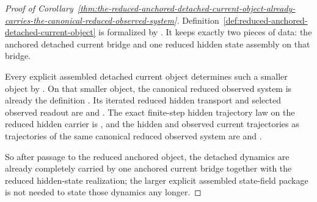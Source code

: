 \begin{proof}[Proof of Corollary~\ref{thm:the-reduced-anchored-detached-current-object-already-carries-the-canonical-reduced-observed-system}]
\label{proof:thm:the-reduced-anchored-detached-current-object-already-carries-the-canonical-reduced-observed-system}
Definition~\ref{def:reduced-anchored-detached-current-object} is formalized by
. It keeps exactly two
pieces of data: the anchored detached current bridge and one reduced hidden
state assembly on that bridge.

Every explicit assembled detached current object determines such a smaller
object by
.
On that smaller object, the canonical reduced observed system is already the
definition
. Its
iterated reduced hidden transport and selected observed readout are
and
. The
exact finite-step hidden trajectory law on the reduced hidden carrier is
,
and the hidden and observed current trajectories as trajectories of the same
canonical reduced observed system are
 and
.

So after passage to the reduced anchored object, the detached dynamics are
already completely carried by one anchored current bridge together with the
reduced hidden-state realization; the larger explicit assembled state-field
package is not needed to state those dynamics any longer.
\end{proof}

